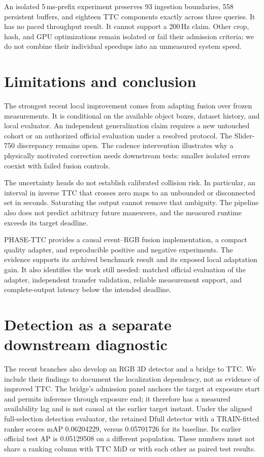 \documentclass[twocolumn,letterpaper]{article}
\begin{document}
An isolated 5\,ms-prefix experiment preserves 93 ingestion boundaries, 558 persistent buffers, and eighteen TTC components exactly across three queries. It has no paced throughput result. It cannot support a 200\,Hz claim. Other crop, hash, and GPU optimizations remain isolated or fail their admission criteria; we do not combine their individual speedups into an unmeasured system speed.

\section{Limitations and conclusion}
The strongest recent local improvement comes from adapting fusion over frozen measurements. It is conditional on the available object boxes, dataset history, and local evaluator. An independent generalization claim requires a new untouched cohort or an authorized official evaluation under a resolved protocol. The Slider-750 discrepancy remains open. The cadence intervention illustrates why a physically motivated correction needs downstream tests: smaller isolated errors coexist with failed fusion controls.

The uncertainty heads do not establish calibrated collision risk. In particular, an interval in inverse TTC that crosses zero maps to an unbounded or disconnected set in seconds. Saturating the output cannot remove that ambiguity. The pipeline also does not predict arbitrary future maneuvers, and the measured runtime exceeds its target deadline.

PHASE-TTC provides a causal event--RGB fusion implementation, a compact quality adapter, and reproducible positive and negative experiments. The evidence supports its archived benchmark result and its exposed local adaptation gain. It also identifies the work still needed: matched official evaluation of the adapter, independent transfer validation, reliable measurement support, and complete-output latency below the intended deadline.

\clearpage
\appendix
\section{Detection as a separate downstream diagnostic}
\label{app:detection}
The recent branches also develop an RGB 3D detector and a bridge to TTC. We include their findings to document the localization dependency, not as evidence of improved TTC. The bridge's admission panel anchors the target at exposure start and permits inference through exposure end; it therefore has a measured availability lag and is not causal at the earlier target instant. Under the aligned full-selection detection evaluator, the retained Dfull detector with a TRAIN-fitted ranker scores mAP 0.06204229, versus 0.05701726 for its baseline. Its earlier official test AP is 0.05129508 on a different population. These numbers must not share a ranking column with TTC MiD or with each other as paired test results.
\end{document}
